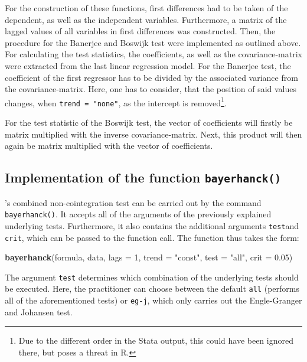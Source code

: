 \documentclass[12pt,a4paper]{article}
\newenvironment{Shaded}{\begin{snugshade}}{\end{snugshade}}
\newcommand{\DataTypeTok}[1]{\textcolor[rgb]{0.13,0.29,0.53}{#1}}
\newcommand{\DecValTok}[1]{\textcolor[rgb]{0.00,0.00,0.81}{#1}}
\newcommand{\FloatTok}[1]{\textcolor[rgb]{0.00,0.00,0.81}{#1}}
\newcommand{\KeywordTok}[1]{\textcolor[rgb]{0.13,0.29,0.53}{\textbf{#1}}}
\newcommand{\NormalTok}[1]{#1}
\newcommand{\StringTok}[1]{\textcolor[rgb]{0.31,0.60,0.02}{#1}}
\let\rmarkdownfootnote\footnote%
\def\footnote{\protect\rmarkdownfootnote}
\begin{document}
For the construction of these functions, first differences had to be
taken of the dependent, as well as the independent variables.
Furthermore, a matrix of the lagged values of all variables in first
differences was constructed. Then, the procedure for the Banerjee and
Boswijk test were implemented as outlined above. For calculating the
test statistics, the coefficients, as well as the covariance-matrix were
extracted from the last linear regression model. For the Banerjee test,
the coefficient of the first regressor has to be divided by the
associated variance from the covariance-matrix. Here, one has to
consider, that the position of said values changes, when
\texttt{trend\ =\ "none"}, as the intercept is removed\footnote{Due to
  the different order in the Stata output, this could have been ignored
  there, but poses a threat in R.}.

For the test statistic of the Boswijk test, the vector of coefficients
will firstly be matrix multiplied with the inverse covariance-matrix.
Next, this product will then again be matrix multiplied with the vector
of coefficients.

\hypertarget{implementation-of-the-function-bayerhanck}{%
\subsection{\texorpdfstring{Implementation of the function
\texttt{bayerhanck()}}{Implementation of the function bayerhanck()}}\label{implementation-of-the-function-bayerhanck}}

\textcite{Bayerhanck2009}'s combined non-cointegration test can be
carried out by the command \texttt{bayerhanck()}. It accepts all of the
arguments of the previously explained underlying tests. Furthermore, it
also contains the additional arguments \texttt{test}and \texttt{crit},
which can be passed to the function call. The function thus takes the
form:

\begin{Shaded}
\begin{Highlighting}[]
\KeywordTok{bayerhanck}\NormalTok{(formula, data, }\DataTypeTok{lags =} \DecValTok{1}\NormalTok{, }\DataTypeTok{trend =} \StringTok{"const"}\NormalTok{, }
           \DataTypeTok{test =} \StringTok{"all"}\NormalTok{, }\DataTypeTok{crit =} \FloatTok{0.05}\NormalTok{)}
\end{Highlighting}
\end{Shaded}

The argument \texttt{test} determines which combination of the
underlying tests should be executed. Here, the practitioner can choose
between the default \texttt{all} (performs all of the aforementioned
tests) or \texttt{eg-j}, which only carries out the Engle-Granger and
Johansen test.
\end{document}
